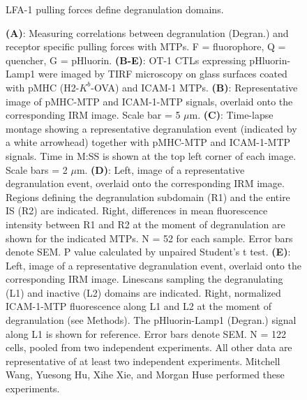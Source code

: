 \clearpage
\begin{figure}[htbp]
	\caption{LFA-1 pulling forces define degranulation domains.}
    \caption*{\textbf{(A)}: Measuring correlations between degranulation (Degran.) and receptor specific pulling forces with MTPs. F = fluorophore, Q = quencher, G = pHluorin. \textbf{(B-E)}: OT-1 CTLs expressing pHluorin-Lamp1 were imaged by TIRF microscopy on glass surfaces coated with pMHC (H2-$K^{b}$-OVA) and ICAM-1 MTPs. \textbf{(B)}: Representative image of pMHC-MTP and ICAM-1-MTP signals, overlaid onto the corresponding IRM image. Scale bar = 5 $\mu$m. \textbf{(C)}: Time-lapse montage showing a representative degranulation event (indicated by a white arrowhead) together with pMHC-MTP and ICAM-1-MTP signals. Time in M:SS is shown at the top left corner of each image. Scale bars = 2 $\mu$m. \textbf{(D)}: Left, image of a representative degranulation event, overlaid onto the corresponding IRM image. Regions defining the degranulation subdomain (R1) and the entire IS (R2) are indicated. Right, differences in mean fluorescence intensity between R1 and R2 at the moment of degranulation are shown for the indicated MTPs. N = 52 for each sample. Error bars denote SEM. P value calculated by unpaired Student’s t test. \textbf{(E)}: Left, image of a representative degranulation event, overlaid onto the corresponding IRM image. Linescans sampling the degranulating (L1) and inactive (L2) domains are indicated. Right, normalized ICAM-1-MTP fluorescence along L1 and L2 at the moment of degranulation (see Methods). The pHluorin-Lamp1 (Degran.) signal along L1 is shown for reference. Error bars denote SEM. N = 122 cells, pooled from two independent experiments. All other data are representative of at least two independent experiments. Mitchell Wang, Yuesong Hu, Xihe Xie, and Morgan Huse performed these experiments.}
    \label{fig:fig3mtp}
\end{figure}
\clearpage
